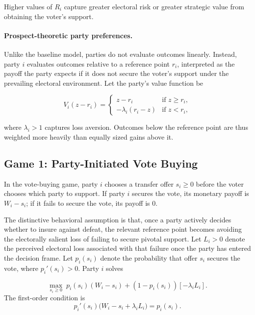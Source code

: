 \documentclass[11pt]{article}
\begin{document}
Higher values of $R_i$ capture greater electoral risk or greater strategic value from obtaining the voter's support.

\paragraph{Prospect-theoretic party preferences.}

Unlike the baseline model, parties do not evaluate outcomes linearly. Instead, party $i$ evaluates outcomes relative to a reference point $r_i$, interpreted as the payoff the party expects if it does not secure the voter's support under the prevailing electoral environment. Let the party's value function be

\begin{equation}
V_i(z-r_i)=
\begin{cases}
z-r_i & \text{if } z\geq r_i,\\
-\lambda_i(r_i-z) & \text{if } z<r_i,
\end{cases}
\end{equation}

where $\lambda_i>1$ captures loss aversion. Outcomes below the reference point are thus weighted more heavily than equally sized gains above it.

\subsection*{Game 1: Party-Initiated Vote Buying}

In the vote-buying game, party $i$ chooses a transfer offer $s_i\geq 0$ before the voter chooses which party to support. If party $i$ secures the vote, its monetary payoff is $W_i-s_i$; if it fails to secure the vote, its payoff is $0$.

The distinctive behavioral assumption is that, once a party actively decides whether to insure against defeat, the relevant reference point becomes avoiding the electorally salient loss of failing to secure pivotal support. Let $L_i>0$ denote the perceived electoral loss associated with that failure once the party has entered the decision frame. Let $p_i(s_i)$ denote the probability that offer $s_i$ secures the vote, where $p_i'(s_i)>0$. Party $i$ solves

\begin{equation}
\max_{s_i\geq 0}\; p_i(s_i)(W_i-s_i)+(1-p_i(s_i))[-\lambda_i L_i].
\end{equation}
The first-order condition is
\begin{equation}
p_i'(s_i)\bigl(W_i-s_i+\lambda_i L_i\bigr)=p_i(s_i).
\end{equation}
\end{document}
